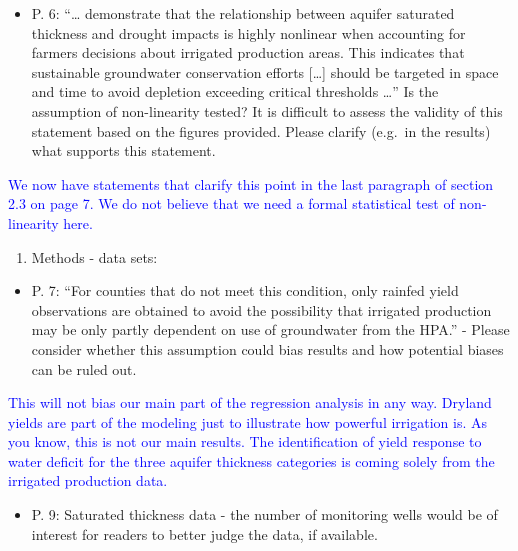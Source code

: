 \documentclass[
]{article}
\providecommand{\tightlist}{%
  \setlength{\itemsep}{0pt}\setlength{\parskip}{0pt}}
\begin{document}
\begin{itemize}
\tightlist
\item
  P. 6: ``\ldots{} demonstrate that the relationship between aquifer
  saturated thickness and drought impacts is highly nonlinear when
  accounting for farmers decisions about irrigated production areas.
  This indicates that sustainable groundwater conservation efforts
  {[}\ldots{]} should be targeted in space and time to avoid depletion
  exceeding critical thresholds \ldots{}'' Is the assumption of
  non-linearity tested? It is difficult to assess the validity of this
  statement based on the figures provided. Please clarify (e.g.~in the
  results) what supports this statement.
\end{itemize}

\textcolor{blue}{We now have statements that clarify this point in the last paragraph of section 2.3 on page 7. We do not believe that we need a formal statistical test of non-linearity here.}

\begin{enumerate}
\def\labelenumi{\arabic{enumi}.}
\setcounter{enumi}{5}
\tightlist
\item
  Methods - data sets:
\end{enumerate}

\begin{itemize}
\tightlist
\item
  P. 7: ``For counties that do not meet this condition, only rainfed
  yield observations are obtained to avoid the possibility that
  irrigated production may be only partly dependent on use of
  groundwater from the HPA.'' - Please consider whether this assumption
  could bias results and how potential biases can be ruled out.
\end{itemize}

\textcolor{blue}{
This will not bias our main part of the regression analysis in any way. Dryland yields are part of the modeling just to illustrate how powerful irrigation is. As you know, this is not our main results. The identification of yield response to water deficit for the three aquifer thickness categories is coming solely from the irrigated production data.
}

\begin{itemize}
\tightlist
\item
  P. 9: Saturated thickness data - the number of monitoring wells would
  be of interest for readers to better judge the data, if available.
\end{itemize}
\end{document}
